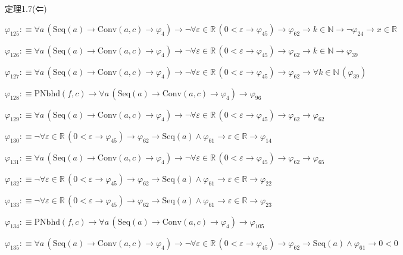 \begin{fullproof}{定理1.7(⇐)}
\begin{abbrevlist}
\item $\varphi_{125} :\equiv \forall a\,(\mathrm{Seq}(a) \to \mathrm{Conv}(a,c) \to \varphi_{4}) \to \neg \forall \varepsilon \in \mathbb{R}\,(0 < \varepsilon \to \varphi_{45}) \to \varphi_{62} \to k \in \mathbb{N} \to \neg \varphi_{24} \to x \in \mathbb{R}$
\item $\varphi_{126} :\equiv \forall a\,(\mathrm{Seq}(a) \to \mathrm{Conv}(a,c) \to \varphi_{4}) \to \neg \forall \varepsilon \in \mathbb{R}\,(0 < \varepsilon \to \varphi_{45}) \to \varphi_{62} \to k \in \mathbb{N} \to \varphi_{39}$
\item $\varphi_{127} :\equiv \forall a\,(\mathrm{Seq}(a) \to \mathrm{Conv}(a,c) \to \varphi_{4}) \to \neg \forall \varepsilon \in \mathbb{R}\,(0 < \varepsilon \to \varphi_{45}) \to \varphi_{62} \to \forall k \in \mathbb{N}\,(\varphi_{39})$
\item $\varphi_{128} :\equiv \mathrm{PNbhd}(f,c) \to \forall a\,(\mathrm{Seq}(a) \to \mathrm{Conv}(a,c) \to \varphi_{4}) \to \varphi_{96}$
\item $\varphi_{129} :\equiv \forall a\,(\mathrm{Seq}(a) \to \mathrm{Conv}(a,c) \to \varphi_{4}) \to \neg \forall \varepsilon \in \mathbb{R}\,(0 < \varepsilon \to \varphi_{45}) \to \varphi_{62} \to \varphi_{62}$
\item $\varphi_{130} :\equiv \neg \forall \varepsilon \in \mathbb{R}\,(0 < \varepsilon \to \varphi_{45}) \to \varphi_{62} \to \mathrm{Seq}(a) \land \varphi_{61} \to \varepsilon \in \mathbb{R} \to \varphi_{14}$
\item $\varphi_{131} :\equiv \forall a\,(\mathrm{Seq}(a) \to \mathrm{Conv}(a,c) \to \varphi_{4}) \to \neg \forall \varepsilon \in \mathbb{R}\,(0 < \varepsilon \to \varphi_{45}) \to \varphi_{62} \to \varphi_{65}$
\item $\varphi_{132} :\equiv \neg \forall \varepsilon \in \mathbb{R}\,(0 < \varepsilon \to \varphi_{45}) \to \varphi_{62} \to \mathrm{Seq}(a) \land \varphi_{61} \to \varepsilon \in \mathbb{R} \to \varphi_{22}$
\item $\varphi_{133} :\equiv \neg \forall \varepsilon \in \mathbb{R}\,(0 < \varepsilon \to \varphi_{45}) \to \varphi_{62} \to \mathrm{Seq}(a) \land \varphi_{61} \to \varepsilon \in \mathbb{R} \to \varphi_{23}$
\item $\varphi_{134} :\equiv \mathrm{PNbhd}(f,c) \to \forall a\,(\mathrm{Seq}(a) \to \mathrm{Conv}(a,c) \to \varphi_{4}) \to \varphi_{105}$
\item $\varphi_{135} :\equiv \forall a\,(\mathrm{Seq}(a) \to \mathrm{Conv}(a,c) \to \varphi_{4}) \to \neg \forall \varepsilon \in \mathbb{R}\,(0 < \varepsilon \to \varphi_{45}) \to \varphi_{62} \to \mathrm{Seq}(a) \land \varphi_{61} \to 0 < 0$

\end{abbrevlist}
\end{fullproof}
